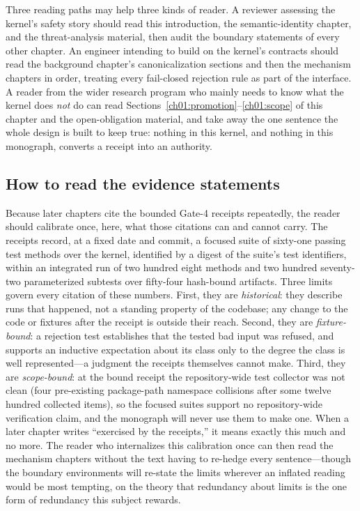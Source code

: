 Three reading paths may help three kinds of reader. A reviewer assessing
the kernel's safety story should read this introduction, the
semantic-identity chapter, and the threat-analysis material, then audit
the boundary statements of every other chapter. An engineer intending
to build on the kernel's contracts should read the background chapter's
canonicalization sections and then the mechanism chapters in order,
treating every fail-closed rejection rule as part of the interface. A
reader from the wider research program who mainly needs to know what
the kernel does \emph{not} do can read
Sections~\ref{ch01:promotion}--\ref{ch01:scope} of this chapter and the
open-obligation material, and take away the one sentence the whole
design is built to keep true: nothing in this kernel, and nothing in
this monograph, converts a receipt into an authority.

\subsection{How to read the evidence statements}\label{ch01:evidencehow}

Because later chapters cite the bounded Gate-4 receipts repeatedly, the
reader should calibrate once, here, what those citations can and cannot
carry. The receipts record, at a fixed date and commit, a focused suite
of sixty-one passing test methods over the kernel, identified by a
digest of the suite's test identifiers, within an integrated run of two
hundred eight methods and two hundred seventy-two parameterized
subtests over fifty-four hash-bound artifacts. Three limits govern
every citation of these numbers. First, they are \emph{historical}:
they describe runs that happened, not a standing property of the
codebase; any change to the code or fixtures after the receipt is
outside their reach. Second, they are \emph{fixture-bound}: a rejection
test establishes that the tested bad input was refused, and supports an
inductive expectation about its class only to the degree the class is
well represented---a judgment the receipts themselves cannot make.
Third, they are \emph{scope-bound}: at the bound receipt the
repository-wide test collector was not clean (four pre-existing
package-path namespace collisions after some twelve hundred collected
items), so the focused suites support no repository-wide verification
claim, and the monograph will never use them to make one. When a later
chapter writes ``exercised by the receipts,'' it means exactly this
much and no more. The reader who internalizes this calibration once
can then read the mechanism chapters without the text having to
re-hedge every sentence---though the boundary environments will
re-state the limits wherever an inflated reading would be most
tempting, on the theory that redundancy about limits is the one form
of redundancy this subject rewards.

